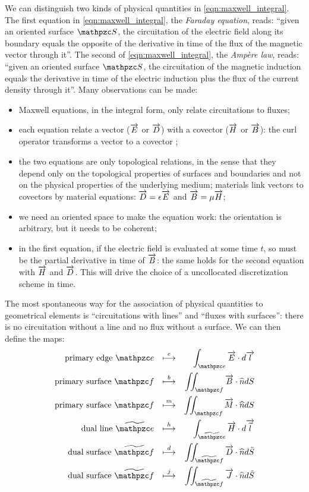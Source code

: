 We can distinguish two kinds of physical quantities in
\eqref{eqn:maxwell_integral}. The first equation in
\eqref{eqn:maxwell_integral}, the \emph{Faraday equation}, reads:
``given an oriented surface $\Surface{S}$, the circuitation of the
electric field along its boundary equals the opposite of the
derivative in time of the flux of the magnetic vector through
it''. The second of \eqref{eqn:maxwell_integral}, the \emph{Amp\`ere
law}, reads: ``given an oriented surface $\Surface{S}$, the
circuitation of the magnetic induction equals the derivative in time
of the electric induction plus the flux of the current density through
it''. Many observations can be made:
\begin{itemize}
\item
  Maxwell equations, in the integral form, only relate circuitations
  to fluxes;
\item
  each equation relate a vector ($\overrightarrow{E}$ or $\overrightarrow{D}$) with a covector ($\overrightarrow{H}$
  or $\overrightarrow{B}$): the curl operator transforms a vector to a covector
  \cite{bossavit_computational};
\item
  the two equations are only topological relations, in the sense that
  they depend only on the topological properties of surfaces and boundaries
  and not on the physical properties of the underlying medium;
  materials link vectors to covectors by material equations: $\overrightarrow{D} =
  \epsilon \overrightarrow{E}$ and $\overrightarrow{B} = \mu \overrightarrow{H}$;
\item
  we need an oriented space to make the equation work: the orientation
  is arbitrary, but it needs to be coherent;
\item
  in the first equation, if the electric field is evaluated at some
  time $t$, so must be the partial derivative in time of $\overrightarrow{B}$: the
  same holds for the second equation with $\overrightarrow{H}$ and $\overrightarrow{D}$. This will drive
  the choice of a uncollocated discretization scheme in time.
\end{itemize}

The most spontaneous way for the association of physical quantities to
geometrical elements is ``circuitations with
lines'' and ``fluxes with surfaces'': there is no circuitation without
a line and no flux without a surface. We can then define the maps:
\begin{equation} \label{eqn:dof} \begin{aligned}
  \text{primary edge $\Line{e}$} && \Map{e} && \int_{\Line{e}}{\DotProd{\E}{\d\Vector{l}}} \\
  \text{primary surface $\Surface{f}$} && \Map{b} && \iint_{\Surface{f}}{\DotProd{\B}{\Versor{n}}\d S} \\
  \text{primary surface $\Surface{f}$} && \Map{m} && \iint_{\Surface{f}}{\DotProd{\M}{\Versor{n}}\d S} \\
  \text{dual line $\DualLine{e}$} && \Map{h} && \int_{\DualLine{e}}{\DotProd{\H}{\d\Vector{\Dual{l}}}} \\
  \text{dual surface $\DualSurface{f}$} && \Map{d} && \iint_{\DualSurface{f}}{\DotProd{\D}{\Versor{n}}\d\tilde{S}} \\
  \text{dual surface $\DualSurface{f}$} && \Map{j} && \iint_{\DualSurface{f}}{\DotProd{\J}{\Versor{n}}\d\tilde{S}}
\end{aligned} \end{equation}

